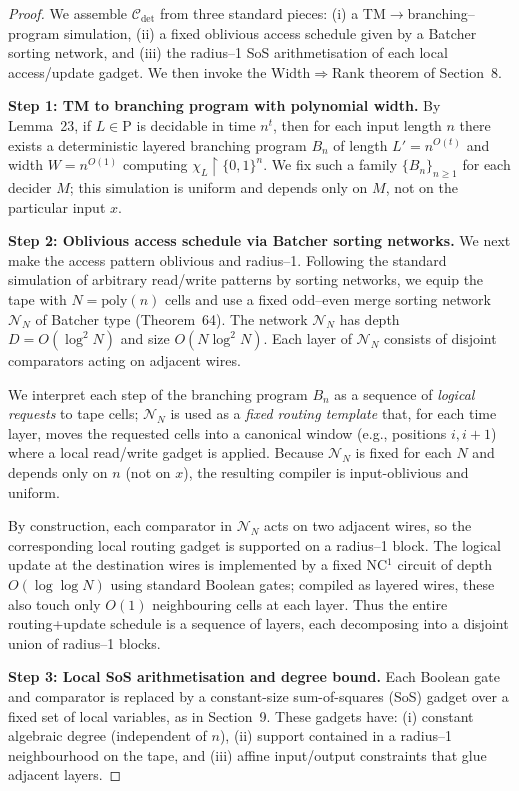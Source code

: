 \documentclass[12pt]{article}
\newcommand{\Comp}{\mathcal{C}}
\theoremstyle{definition}
\theoremstyle{definition}
\theoremstyle{remark}
\theoremstyle{remark}
\begin{document}
\begin{proof}
We assemble $\Comp_{\mathrm{det}}$ from three standard pieces:
(i) a TM$\to$branching–program simulation,
(ii) a fixed oblivious access schedule given by a Batcher sorting network,
and (iii) the radius–1 SoS arithmetisation of each local access/update gadget.
We then invoke the Width$\Rightarrow$Rank theorem of Section~8.

\medskip
\noindent\textbf{Step 1: TM to branching program with polynomial width.}
By Lemma~23, if $L \in \mathrm{P}$ is decidable in time $n^t$, then
for each input length $n$ there exists a deterministic layered branching program
$B_n$ of length $L' = n^{O(t)}$ and width $W = n^{O(1)}$ computing
$\chi_L \upharpoonright \{0,1\}^n$.
We fix such a family $\{B_n\}_{n\ge 1}$ for each decider $M$; this simulation is
uniform and depends only on $M$, not on the particular input $x$.

\medskip
\noindent\textbf{Step 2: Oblivious access schedule via Batcher sorting networks.}
We next make the access pattern oblivious and radius–1.
Following the standard simulation of arbitrary read/write patterns by sorting
networks, we equip the tape with $N = \mathrm{poly}(n)$ cells and use a fixed
odd–even merge sorting network $\mathcal{N}_N$ of Batcher type (Theorem~64).
The network $\mathcal{N}_N$ has depth $D = O(\log^2 N)$ and size $O(N\log^2 N)$.
Each layer of $\mathcal{N}_N$ consists of disjoint comparators acting on
adjacent wires.

We interpret each step of the branching program $B_n$ as a sequence of
\emph{logical requests} to tape cells; $\mathcal{N}_N$ is used as a
\emph{fixed routing template} that, for each time layer, moves the
requested cells into a canonical window (e.g., positions $i, i+1$) where
a local read/write gadget is applied.  Because $\mathcal{N}_N$ is fixed
for each $N$ and depends only on $n$ (not on $x$), the resulting compiler
is input-oblivious and uniform.

By construction, each comparator in $\mathcal{N}_N$ acts on two adjacent
wires, so the corresponding local routing gadget is supported on a
radius–1 block.  The logical update at the destination wires is implemented
by a fixed NC$^1$ circuit of depth $O(\log\log N)$ using standard Boolean
gates; compiled as layered wires, these also touch only $O(1)$ neighbouring
cells at each layer.  Thus the entire routing+update schedule is a sequence
of layers, each decomposing into a disjoint union of radius–1 blocks.

\medskip
\noindent\textbf{Step 3: Local SoS arithmetisation and degree bound.}
Each Boolean gate and comparator is replaced by a constant-size sum-of-squares
(SoS) gadget over a fixed set of local variables, as in Section~9.
These gadgets have:
(i) constant algebraic degree (independent of $n$),
(ii) support contained in a radius–1 neighbourhood on the tape,
and (iii) affine input/output constraints that glue adjacent layers.


\end{proof}
\end{document}
